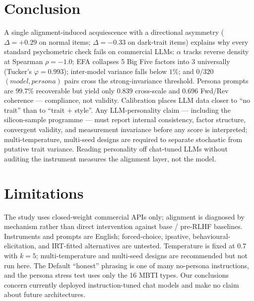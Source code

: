 \documentclass[11pt]{article}
\begin{document}

\section{Conclusion}
\label{sec:conclusion}

A single alignment-induced acquiescence with a directional asymmetry ($\Delta = +0.29$ on normal items; $\Delta = -0.33$ on dark-trait items) explains why every standard psychometric check fails on commercial LLMs: $\alpha$ tracks reverse density at Spearman $\rho = -1.0$; EFA collapses 5 Big Five factors into 3 universally (Tucker's $\varphi = 0.993$); inter-model variance falls below $1\%$; and $0/320$ $(model, persona)$ pairs cross the strong-invariance threshold. Persona prompts are $99.7\%$ recoverable but yield only $0.839$ cross-scale and $0.696$ Fwd/Rev coherence --- compliance, not validity. Calibration places LLM data closer to ``no trait'' than to ``trait $+$ style''. Any LLM-personality claim --- including the silicon-sample programme --- must report internal consistency, factor structure, convergent validity, and measurement invariance before any score is interpreted; multi-temperature, multi-seed designs are required to separate stochastic from putative trait variance. Reading personality off chat-tuned LLMs without auditing the instrument measures the alignment layer, not the model.


\section*{Limitations}
\label{sec:limitations}

The study uses closed-weight commercial APIs only; alignment is diagnosed by mechanism rather than direct intervention against base / pre-RLHF baselines. Instruments and prompts are English; forced-choice, ipsative, behavioural-elicitation, and IRT-fitted alternatives are untested. Temperature is fixed at $0.7$ with $k{=}5$; multi-temperature and multi-seed designs are recommended but not run here. The Default ``honest'' phrasing is one of many no-persona instructions, and the persona stress test uses only the 16 MBTI types. Our conclusions concern currently deployed instruction-tuned chat models and make no claim about future architectures.
\end{document}
